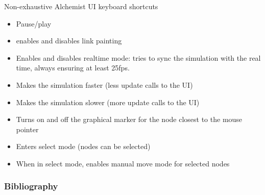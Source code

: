 \documentclass[presentation]{beamer}
\begin{document}
\begin{frame}[fragile]{Non-exhaustive Alchemist UI keyboard shortcuts}
	\begin{itemize}
	  \item[P] Pause/play
	  \item[L] enables and disables link painting
	  \item[R] Enables and disables realtime mode: tries to sync the simulation with the real time, always ensuring at least 25fps.
	  \item[$\rightarrow{}$] Makes the simulation faster (less update calls to the UI)
	  \item[$\leftarrow{}$] Makes the simulation slower (more update calls to the UI)
	  \item[M] Turns on and off the graphical marker for the node closest to the mouse pointer
	  \item[S] Enters select mode (nodes can be selected)
	  \item[O] When in select mode, enables manual move mode for selected nodes
	\end{itemize}
\end{frame}


\begin{frame}[allowframebreaks]
  \frametitle{Bibliography}
  
  
\end{frame}
\end{document}
